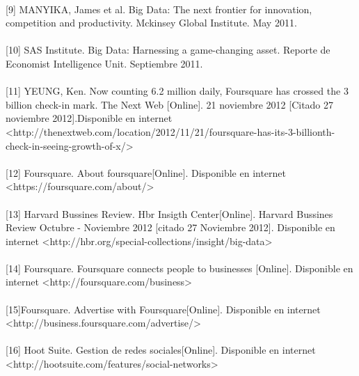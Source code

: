 \paragraph{}
[9]  MANYIKA, James et al.  Big Data: The next frontier for innovation, competition and productivity. Mckinsey Global Institute. May 2011.
\paragraph{}
[10] SAS Institute.  Big Data: Harnessing a game-changing asset. Reporte de Economist Intelligence Unit. Septiembre 2011.
\paragraph{}
[11] YEUNG, Ken. Now counting 6.2 million daily, Foursquare has crossed the 3 billion check-in mark. The Next Web [Online]. 21 noviembre 2012 [Citado 27 noviembre 2012].Disponible en internet \textless http://thenextweb.com/location/2012/11/21/foursquare-has-its-3-billionth-check-in-seeing-growth-of-x/\textgreater 
\paragraph{}
[12] Foursquare. About foursquare[Online]. Disponible en internet \textless https://foursquare.com/about/\textgreater
\paragraph{}
[13] Harvard Bussines Review. Hbr Insigth Center[Online]. Harvard Bussines Review Octubre - Noviembre 2012 [citado 27 Noviembre 2012]. Disponible en internet \textless http://hbr.org/special-collections/insight/big-data\textgreater
\paragraph{}
[14] Foursquare. Foursquare connects people to businesses
[Online]. Disponible en internet \textless http://foursquare.com/business\textgreater
\paragraph{}
[15]Foursquare. Advertise with Foursquare[Online]. Disponible en internet \textless http://business.foursquare.com/advertise/\textgreater
\paragraph{}
[16] Hoot Suite. Gestion de redes sociales[Online]. Disponible en internet \textless http://hootsuite.com/features/social-networks\textgreater
\pagebreak